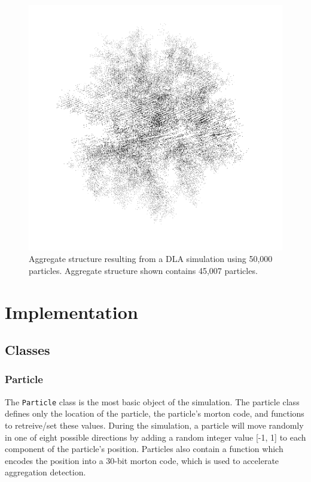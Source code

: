 \documentclass[fleqn,10pt]{UserGuideArx} %
\begin{document}
\begin{figure}[!h]\centering %
    \includegraphics[width=\linewidth]{images/DLA45007-2-BW.png}
    \caption{Aggregate structure resulting from a DLA simulation using 50,000 particles. Aggregate structure shown contains 45,007 particles.}
    \label{fig:DLA45007}
    \end{figure}


\section{Implementation}
\subsection{Classes}
\subsubsection{Particle}
The \texttt{Particle} class is the most basic object of the simulation. The particle class defines only the location of the particle, the particle’s morton code, and functions to retreive/set these values. During the simulation, a particle will move randomly in one of eight possible directions by adding a random integer value [-1, 1] to each component of the particle’s position. Particles also contain a function which encodes the position into a 30-bit morton code, which is used to accelerate aggregation detection.\\
\end{document}
